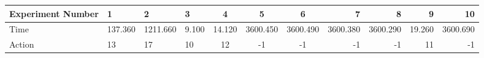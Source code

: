 \documentclass[8pt]{article}
\begin{document}
\begin{landscape}
\begin{tabular}{ | l | l | l | l | c | c | c | r | r | r | r | }
 \hline 
Experiment Number & 1 & 2 & 3 & 4 & 5 & 6 & 7 & 8 & 9 & 10\\ \hline
Time & 137.360 & 1211.660 & 9.100 & 14.120 & 3600.450 & 3600.490 & 3600.380 & 3600.290 & 19.260 & 3600.690\\ \hline
Action & 13 & 17 & 10 & 12 & -1 & -1 & -1 & -1 & 11 & -1\\ \hline\end{tabular}
\end{landscape}
\end{document}
